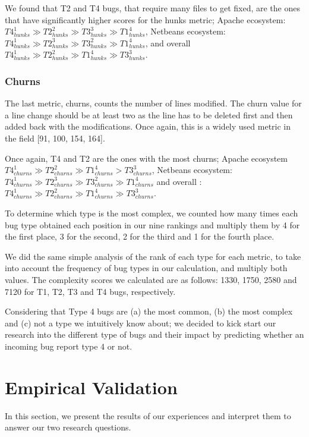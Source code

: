 \documentclass[12pt]{report}
\begin{document}
We found that T2 and T4 bugs, that require many files to get fixed, are
the ones that have significantly higher scores for the hunks metric;
Apache ecosystem:
\(T4_{hunks}^1 \gg T2_{hunks}^2 \gg T3_{hunks}^3 \gg T1_{hunks}^4\),
Netbeans ecosystem:
\(T4_{hunks}^1 \gg T2_{hunks}^3 \gg T3_{hunks}^2 \gg T1_{hunks}^4\), and
overall
\(T4_{hunks}^1 \gg T2_{hunks}^2 \gg T1_{hunks}^4 \gg T3_{hunks}^3\).

\subsubsection{Churns}\label{churns}

The last metric, churns, counts the number of lines modified. The churn
value for a line change should be at least two as the line has to be
deleted first and then added back with the modifications. Once again,
this is a widely used metric in the field {[}91, 100, 154, 164{]}.

Once again, T4 and T2 are the ones with the most churns; Apache
ecosystem
\(T4_{churns}^1 \gg T2_{churns}^2 \gg T1_{churns}^4 > T3_{churns}^3\),
Netbeans ecosystem:
\(T4_{churns}^1 \gg T2_{churns}^3 \gg T3_{churns}^2 \gg T1_{churns}^4\)
and overall :
\(T4_{churns}^1 \gg T2_{churns}^2 \gg T1_{churns}^4 \gg T3_{churns}^3\).

To determine which type is the most complex, we counted how many times
each bug type obtained each position in our nine rankings and multiply
them by 4 for the first place, 3 for the second, 2 for the third and 1
for the fourth place.

We did the same simple analysis of the rank of each type for each
metric, to take into account the frequency of bug types in our
calculation, and multiply both values. The complexity scores we
calculated are as follows: 1330, 1750, 2580 and 7120 for T1, T2, T3 and
T4 bugs, respectively.

Considering that Type 4 bugs are (a) the most common, (b) the most
complex and (c) not a type we intuitively know about; we decided to kick
start our research into the different type of bugs and their impact by
predicting whether an incoming bug report type 4 or not.

\section{Empirical Validation}\label{empirical-validation-4}

In this section, we present the results of our experiences and interpret
them to answer our two research questions.
\end{document}
